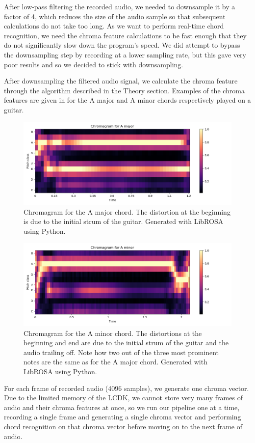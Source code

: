 \documentclass[journal]{IEEEtran}
\begin{document}
After low-pass filtering the recorded audio, we needed to downsample it by a factor of 4, which reduces the size of the audio sample so that subsequent calculations do not take too long.
As we want to perform real-time chord recognition, we need the chroma feature calculations to be fast enough that they do not significantly slow down the program's speed.
We did attempt to bypass the downsampling step by recording at a lower sampling rate, but this gave very poor results and so we decided to stick with downsampling.

After downsampling the filtered audio signal, we calculate the chroma feature through the algorithm described in the Theory section.
Examples of the chroma features are given in  for the A major and A minor chords respectively played on a guitar.
\begin{figure}[!t]
    \centering
    \includegraphics[width = \linewidth]{../Figures/chromagram_a_major}
    \caption{Chromagram for the A major chord.
    The distortion at the beginning is due to the initial strum of the guitar.
    Generated with LibROSA using Python.}
    \label{fig:a_major}
\end{figure}
\begin{figure}[!t]
    \centering
    \includegraphics[width = \linewidth]{../Figures/chromagram_a_minor}
    \caption{Chromagram for the A minor chord.
    The distortions at the beginning and end are due to the initial strum of the guitar and the audio trailing off.
    Note how two out of the three most prominent notes are the same as for the A major chord.
    Generated with LibROSA using Python.}
    \label{fig:a_minor}
\end{figure}
For each frame of recorded audio (4096 samples), we generate one chroma vector.
Due to the limited memory of the LCDK, we cannot store very many frames of audio and their chroma features at once, so we run our pipeline one at a time, recording a single frame and generating a single chroma vector and performing chord recognition on that chroma vector before moving on to the next frame of audio.
\end{document}
